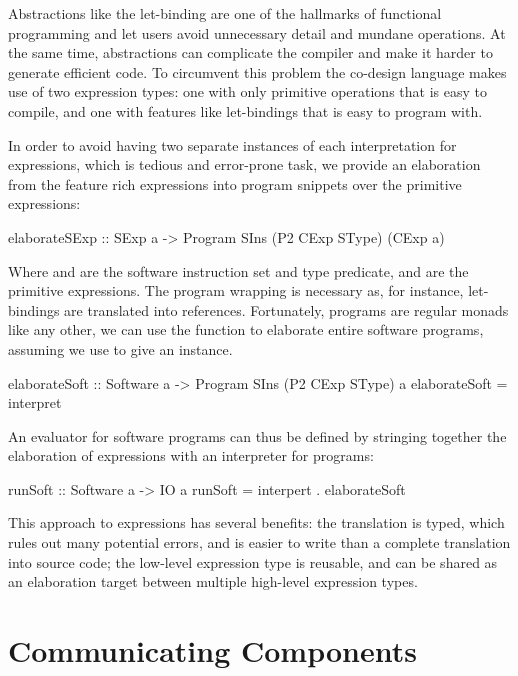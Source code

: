 \documentclass[../paper.tex]{subfiles}
\begin{document}
\noindent Abstractions like the let-binding are one of the hallmarks of functional programming and let users avoid unnecessary detail and mundane operations. At the same time, abstractions can complicate the compiler and make it harder to generate efficient code. To circumvent this problem the co-design language makes use of two expression types: one with only primitive operations that is easy to compile, and one with features like let-bindings that is easy to program with.

In order to avoid having two separate instances of each interpretation for expressions, which is tedious and error-prone task, we provide an elaboration from the feature rich expressions into program snippets over the primitive expressions:

\begin{code}
elaborateSExp :: SExp a -> Program SIns (P2 CExp SType) (CExp a)
\end{code}

\noindent Where  and  are the software instruction set and type predicate, and  are the primitive expressions. The program wrapping is necessary as, for instance, let-bindings are translated into references. Fortunately, programs are regular monads like any other, we can use the  function to elaborate entire software programs, assuming we use  to give an  instance.

\begin{code}
elaborateSoft :: Software a -> Program SIns (P2 CExp SType) a
elaborateSoft = interpret
\end{code}

An evaluator for software programs can thus be defined by stringing together the elaboration of expressions with an interpreter for programs:

\begin{code}
runSoft :: Software a -> IO a
runSoft = interpert . elaborateSoft
\end{code}

This approach to expressions has several benefits: the translation is typed, which rules out many potential errors, and is easier to write than a complete translation into source code; the low-level expression type is reusable, and can be shared as an elaboration target between multiple high-level expression types.

\section{Communicating Components}
\end{document}
